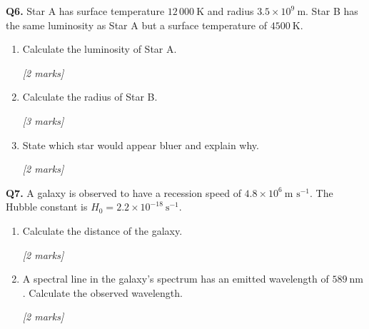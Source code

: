 \begin{tcolorbox}[colback=white, colframe=midblue, breakable]

\begin{minipage}{\linewidth}
\textbf{Q6.} Star A has surface temperature $12\,000\ \text{K}$ and radius $3.5\times10^9\ \text{m}$. Star B has the same luminosity as Star A but a surface temperature of $4500\ \text{K}$.
\end{minipage}

\begin{enumerate}[label=(\alph*)]
  \item \begin{minipage}[t]{\linewidth}
  Calculate the luminosity of Star A.
  \par\hfill\textit{[2 marks]}
  \vspace{3.5cm}
  \end{minipage}

  \item \begin{minipage}[t]{\linewidth}
  Calculate the radius of Star B.
  \par\hfill\textit{[3 marks]}
  \vspace{4.0cm}
  \end{minipage}

  \item \begin{minipage}[t]{\linewidth}
  State which star would appear bluer and explain why.
  \par\hfill\textit{[2 marks]}
  \vspace{2.5cm}
  \end{minipage}
\end{enumerate}

\begin{minipage}{\linewidth}
\textbf{Q7.} A galaxy is observed to have a recession speed of $4.8\times10^6\ \text{m s}^{-1}$. The Hubble constant is $H_0 = 2.2\times10^{-18}\ \text{s}^{-1}$.
\end{minipage}

\begin{enumerate}[label=(\alph*)]
  \item \begin{minipage}[t]{\linewidth}
  Calculate the distance of the galaxy.
  \par\hfill\textit{[2 marks]}
  \vspace{3.0cm}
  \end{minipage}

  \item \begin{minipage}[t]{\linewidth}
  A spectral line in the galaxy's spectrum has an emitted wavelength of $589\ \text{nm}$. Calculate the observed wavelength.
  \par\hfill\textit{[2 marks]}
  \vspace{3.0cm}
  \end{minipage}


\end{enumerate}
\end{tcolorbox}

